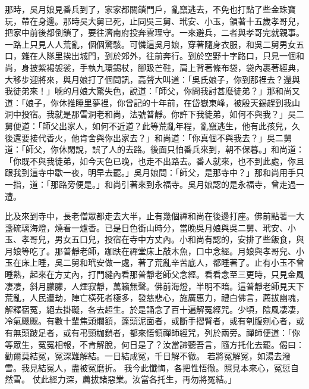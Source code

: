那時，吳月娘見番兵到了，家家都關鎖門戶，亂竄逃去，不免也打點了些金珠寶玩，帶在身邊。那時吳大舅已死，止同吳三舅、玳安、小玉，領著十五歲孝哥兒，把家中前後都倒鎖了，要往濟南府投奔雲理守。一來避兵，二者與孝哥完就親事。一路上只見人人荒亂，個個驚駭。可憐這吳月娘，穿著隨身衣服，和吳二舅男女五口，雜在人隊里挨出城門，到於郊外，往前奔行。到於空野十字路口，只見一個和尚，身披紫褐袈裟，手執九環錫杖，腳趿芒鞋，肩上背著條布袋，袋內裹著經典，大移步迎將來，與月娘打了個問訊，高聲大叫道：「吳氏娘子，你到那裡去？還與我徒弟來！」唬的月娘大驚失色，說道：「師父，你問我討甚麼徒弟？」那和尚又道：「娘子，你休推睡里夢裡，你曾記的十年前，在岱嶽東峰，被殷天錫趕到我山洞中投宿。我就是那雪洞老和尚，法號普靜。你許下我徒弟，如何不與我？」吳二舅便道：「師父出家人，如何不近道？此等荒亂年程，亂竄逃生，他有此孩兒，久後還要接代香火，他肯舍與你出家去？」和尚道：「你真個不與我去？」吳二舅道：「師父，你休閑說，誤了人的去路。後面只怕番兵來到，朝不保暮。」和尚道：「你既不與我徒弟，如今天色已晚，也走不出路去。番人就來，也不到此處，你且跟我到這寺中歇一夜，明早去罷。」吳月娘問：「師父，是那寺中？」那和尚用手只一指，道：「那路旁便是。」和尚引著來到永福寺。吳月娘認的是永福寺，曾走過一遭。

比及來到寺中，長老僧眾都走去大半，止有幾個禪和尚在後邊打座。佛前點著一大盞硫璃海燈，燒看一爐香。已是日色銜山時分，當晚吳月娘與吳二舅、玳安、小玉、孝哥兒，男女五口兒，投宿在寺中方丈內。小和尚有認的，安排了些飯食，與月娘等吃了。那普靜老師，跏趺在禪堂床上敲木魚，口中念經。月娘與孝哥兒、小玉在床上睡，吳二舅和玳安做一處，著了荒亂辛苦底人，都睡著了。止有小玉不曾睡熟，起來在方丈內，打門縫內看那普靜老師父念經。看看念至三更時，只見金風凄凄，斜月朦朦，人煙寂靜，萬籟無聲。佛前海燈，半明不暗。這普靜老師見天下荒亂，人民遭劫，陣亡橫死者極多，發慈悲心，施廣惠力，禮白佛言，薦拔幽魂，解釋宿冤，絕去掛礙，各去超生。於是誦念了百十遍解冤經咒。少頃，陰風凄凄，冷氣颼颼。有數十輩焦頭爛額，蓬頭泥面者，或斷手摺臂者，或有刳腹剜心者，或有無頭跛足者，或有弔頸枷鎖者，都來悟領禪師經咒，列於兩旁。禪師便道：「你等眾生，冤冤相報，不肯解脫，何日是了？汝當諦聽吾言，隨方托化去罷。偈曰：勸爾莫結冤，冤深難解結。一日結成冤，千日解不徹。 若將冤解冤，如湯去潑雪。我見結冤人，盡被冤磨折。 我今此懺悔，各把性悟徹。照見本來心，冤愆自然雪。 仗此經力深，薦拔諸惡業。汝當各托生，再勿將冤結。」

